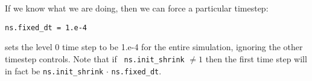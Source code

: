 If we know what we are doing, then we can force a particular timestep:
\begin{lstlisting}
ns.fixed_dt = 1.e-4
\end{lstlisting}
sets the level 0 time step to be 1.e-4 for the entire simulation,
ignoring the other timestep controls.  Note that if {\tt
ns.init\_shrink} $\neq 1$ then the first time step will in fact be
{\tt ns.init\_shrink} $\cdot$ {\tt ns.fixed\_dt}.








